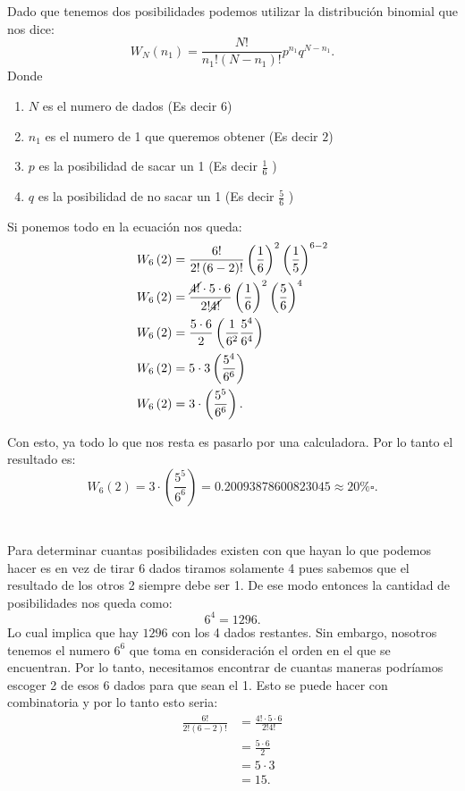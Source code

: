 \documentclass{report}
\begin{document}
\section{}

Dado que tenemos dos posibilidades podemos utilizar la distribución binomial que nos dice: \[
W_N\left( n_1 \right) = \frac{N!}{n_1!\left( N-n_1 \right)!}p^{n_1}q^{N - n_1}
.\] Donde
\begin{enumerate}
  \item $N$ es el numero de dados (Es decir $6$)
  \item $n_1$ es el numero de 1 que queremos obtener (Es decir $2$)
  \item $p$ es la posibilidad de sacar un 1 (Es decir $\frac{1}{6}$ )
  \item $q$ es la posibilidad de no sacar un 1 (Es decir  $\frac{5}{6}$ )
\end{enumerate}

Si ponemos todo en la ecuación nos queda:
\begin{align*}
  W_6\left( 2 \right) &= \frac{6!}{2!\left( 6 - 2 \right)!}\left( \frac{1}{6} \right) ^{2} \left( \frac{1}{5} \right) ^{6-2} \\
  W_6\left( 2 \right) &= \frac{\cancel{4!}\cdot 5 \cdot 6}{2!\cancel{4!}}\left( \frac{1}{6} \right) ^{2}\left( \frac{5}{6} \right) ^{4} \\
  W_6\left( 2 \right) &= \frac{5 \cdot 6}{2}\left( \frac{1}{6^2} \frac{5^{4}}{6^{4}}\right)  \\
  W_6\left( 2 \right) &= 5 \cdot 3 \left( \frac{5^{4}}{6^{6}} \right)  \\
  W_6\left( 2 \right) &= 3 \cdot \left( \frac{5^{5}}{6^{6}} \right)
.\end{align*}

Con esto, ya todo lo que nos resta es pasarlo por una calculadora. Por lo tanto el resultado es: \[
W_6\left( 2 \right) = 3 \cdot \left( \frac{5^{5}}{6^{6}} \right) = 0.20093878600823045 \approx 20\% \square
.\] 

\section{}

Para determinar cuantas posibilidades existen con que hayan lo que podemos hacer es en vez de tirar 6 dados tiramos solamente 4 pues sabemos que el resultado de los otros 2 siempre debe ser 1. De ese modo entonces la cantidad de posibilidades nos queda como: \[
6^{4} = 1296
.\] Lo cual implica que hay $1296$ con los 4 dados restantes. Sin embargo, nosotros tenemos el numero $6^{6}$ que toma en consideración el orden en el que se encuentran. Por lo tanto, necesitamos encontrar de cuantas maneras podríamos escoger 2 de esos 6 dados para que sean el 1. Esto se puede hacer con combinatoria y por lo tanto esto seria:
\begin{align*}
  \frac{6!}{2!\left( 6-2 \right)!} &= \frac{4! \cdot  5 \cdot 6}{2! 4!} \\
  &= \frac{5 \cdot 6}{2} \\ &= 5\cdot 3 \\
  &= 15
.\end{align*}
\end{document}
